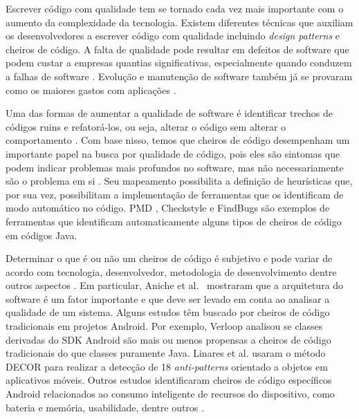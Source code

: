 Escrever c\'odigo com qualidade tem se tornado cada vez mais importante com o aumento da complexidade da tecnologia. Existem diferentes t\'ecnicas que auxiliam os desenvolvedores a escrever c\'odigo com qualidade incluindo \textit{design patterns} e cheiros de c\'odigo. A falta de qualidade pode resultar em defeitos de software que podem custar a empresas quantias significativas, especialmente quando conduzem a falhas de software \cite{Nagappan:2005, briand1993modeling}. Evolu\c{c}\~ao e manuten\c{c}\~ao de software tamb\'em j\'a se provaram como os maiores gastos com aplica\c{c}\~oes \cite{RefactoringAndImprovements:10}.

Uma das formas de aumentar a qualidade de software \'e identificar trechos de c\'odigos ruins e refator\'a-los, ou seja, alterar o c\'odigo sem alterar o comportamento \cite{Refactoring:99}. Com base nisso, temos que cheiros de c\'odigo desempenham um importante papel na busca por qualidade de c\'odigo, pois eles s\~ao sintomas que podem indicar problemas mais profundos no software, mas n\~ao necessariamente s\~ao o problema em si \cite{CodeSmell:06}. Seu mapeamento possibilita a defini\c{c}\~ao de heur\'isticas que, por sua vez, possibilitam a implementa\c{c}\~ao de ferramentas que os identificam de modo autom\'atico no c\'odigo. PMD \cite{PMD2016}, Checkstyle e FindBugs s\~ao exemplos de ferramentas que identificam automaticamente alguns tipos de cheiros de c\'odigo em c\'odigos Java.

Determinar o que \'e ou n\~ao um cheiros de c\'odigo \'e subjetivo e pode variar de acordo com tecnologia, desenvolvedor, metodologia de desenvolvimento dentre outros aspectos \cite{WikiCodeSmell}. Em particular, Aniche et al.~\cite{MvcSmells:16,aniche2016satt} mostraram que a arquitetura do software é um fator importante e que deve ser levado em conta ao analisar a qualidade de um sistema.   Alguns estudos t\^em buscado por cheiros de c\'odigo tradicionais em projetos Android. Por exemplo, Verloop \cite{MobileSmells:13} analisou se classes derivadas do SDK Android s\~ao mais ou menos propensas a cheiros de c\'odigo tradicionais do que classes puramente Java. Linares et al. \cite{DomainMatters} usaram o m\'etodo DECOR para realizar a detec\c{c}\~ao de 18 \textit{anti-patterns} orientado a objetos em aplicativos m\'oveis. Outros estudos identificaram cheiros de c\'odigo espec\'ificos Android relacionados ao consumo inteligente de recursos do dispositivo, como bateria e mem\'oria, usabilidade, dentre outros \cite{EnergyAndroidSmells, ReimannBrylski2013}. 

